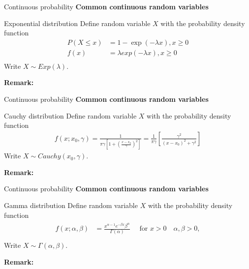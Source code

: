 \documentclass [aspectratio=169]{beamer}
\begin{document}
\begin{frame}{Continuous probability}
\textbf{Common continuous random variables}
\begin{block}{Exponential distribution}
Define random variable $X$ with the probability density function
\begin{equation}
    \begin{aligned}
    P(X \le x) &= 1 - \exp(-\lambda x), x \ge 0 \\
    f(x) &= \lambda exp(-\lambda x), x \ge 0 \\
    \end{aligned}
\end{equation}
Write $X \sim Exp(\lambda)$.
\end{block}
\vspace{0.1in}
\textbf{Remark:}\\
\vspace{0.5in}
\end{frame}



\begin{frame}{Continuous probability}
\textbf{Common continuous random variables}
\begin{block}{Cauchy distribution}
Define random variable $X$ with the probability density function
\begin{equation}
    \begin{aligned}
    f\left(x ; x_{0}, \gamma\right)=\frac{1}{\pi \gamma\left[1+\left(\frac{x-x_{0}}{\gamma}\right)^{2}\right]}=\frac{1}{\pi \gamma}\left[\frac{\gamma^{2}}{\left(x-x_{0}\right)^{2}+\gamma^{2}}\right]
    \end{aligned}
\end{equation}
Write $X \sim Cauchy(x_0, \gamma)$.
\end{block}
\vspace{0.1in}
\textbf{Remark:}\\
\vspace{0.5in}
\end{frame}


\begin{frame}{Continuous probability}
\textbf{Common continuous random variables}
\begin{block}{Gamma distribution}
Define random variable $X$ with the probability density function
\begin{equation}
    \begin{aligned}
   {\displaystyle {\begin{aligned}f(x;\alpha ,\beta )&={\frac {x^{\alpha -1}e^{-\beta x}\beta ^{\alpha }}{\Gamma (\alpha )}}\quad {\text{ for }}x>0\quad \alpha ,\beta >0,\\[6pt]\end{aligned}}}
    \end{aligned}
\end{equation}
Write $X \sim \Gamma(\alpha, \beta)$.
\end{block}
\vspace{0.1in}
\textbf{Remark:}\\
\vspace{0.5in}
\end{frame}
\end{document}
